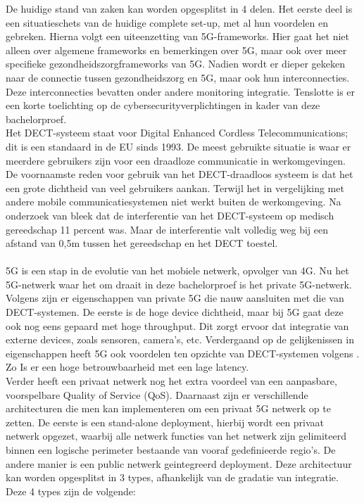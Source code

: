 De huidige stand van zaken kan worden opgesplitst in 4 delen. Het eerste deel is een situatieschets van de huidige complete set-up, met al hun voordelen en gebreken. Hierna volgt een uiteenzetting van 5G-frameworks. Hier gaat het niet alleen over algemene frameworks en bemerkingen over 5G, maar ook over meer specifieke gezondheidszorgframeworks van 5G. Nadien wordt er dieper gekeken naar de connectie tussen gezondheidszorg en 5G, maar ook hun interconnecties. Deze interconnecties bevatten onder andere monitoring integratie. Tenslotte is er een korte toelichting op de cybersecurityverplichtingen in kader van deze bachelorproef.
\\
Het DECT-systeem staat voor Digital Enhanced Cordless Telecommunications; dit is een standaard in de EU sinds 1993. De meest gebruikte situatie is waar er meerdere gebruikers zijn voor een draadloze communicatie in werkomgevingen. De voornaamste reden voor gebruik van het DECT-draadloos systeem is dat het een grote dichtheid van veel gebruikers aankan. Terwijl het in vergelijking met andere mobile communicatiesystemen niet werkt buiten de werkomgeving. \autocite{Welinder1997} Na onderzoek van \textcite{Welinder1997} bleek dat de interferentie van het DECT-systeem op medisch gereedschap 11 percent was. Maar de interferentie valt volledig weg bij een afstand van 0,5m tussen het gereedschap en het DECT toestel.
\\\\
5G is een stap in de evolutie van het mobiele netwerk, opvolger van 4G. Nu het 5G-netwerk waar het om draait in deze bachelorproef is het private 5G-netwerk. Volgens \textcite{wen2021private} zijn er eigenschappen van private 5G die nauw aansluiten met die van DECT-systemen. De eerste is de hoge device dichtheid, maar bij 5G gaat deze ook nog eens gepaard met hoge throughput. Dit zorgt ervoor dat integratie van externe devices, zoals sensoren, camera's, etc. Verdergaand op de gelijkenissen in eigenschappen heeft 5G ook voordelen ten opzichte van DECT-systemen volgens \textcite{wen2021private}. Zo Is er een hoge betrouwbaarheid met een lage latency.\\ Verder heeft een privaat netwerk nog het extra voordeel van een aanpasbare, voorspelbare Quality of Service (QoS). Daarnaast zijn er verschillende architecturen die men kan implementeren om een privaat 5G netwerk op te zetten. De eerste is een stand-alone deployment, hierbij wordt een privaat netwerk opgezet, waarbij alle netwerk functies van het netwerk zijn gelimiteerd binnen een logische perimeter bestaande van vooraf gedefinieerde regio's. De andere manier is een public netwerk geintegreerd deployment. Deze architectuur kan worden opgesplitst in 3 types, afhankelijk van de gradatie van integratie. Deze 4 types zijn de volgende:

